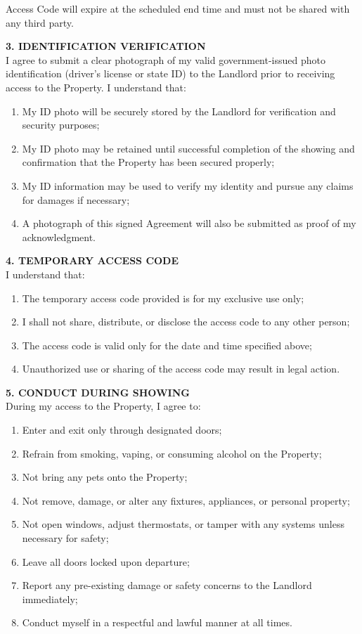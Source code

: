 \documentclass[11pt, letterpaper]{article}
\begin{document}
\begin{Form}
\vspace{0.3em}
Access Code will expire at the scheduled end time and must not be shared with any third party.

\textbf{3. IDENTIFICATION VERIFICATION}\\
I agree to submit a clear photograph of my valid government-issued photo identification (driver's license or state ID) to the Landlord prior to receiving access to the Property. I understand that:
\begin{enumerate}[label=\alph*), nosep, leftmargin=2em]
    \item My ID photo will be securely stored by the Landlord for verification and security purposes;
    \item My ID photo may be retained until successful completion of the showing and confirmation that the Property has been secured properly;
    \item My ID information may be used to verify my identity and pursue any claims for damages if necessary;
    \item A photograph of this signed Agreement will also be submitted as proof of my acknowledgment.
\end{enumerate}

\textbf{4. TEMPORARY ACCESS CODE}\\
I understand that:
\begin{enumerate}[label=\alph*), nosep, leftmargin=2em]
    \item The temporary access code provided is for my exclusive use only;
    \item I shall not share, distribute, or disclose the access code to any other person;
    \item The access code is valid only for the date and time specified above;
    \item Unauthorized use or sharing of the access code may result in legal action.
\end{enumerate}

\textbf{5. CONDUCT DURING SHOWING}\\
During my access to the Property, I agree to:
\begin{enumerate}[label=\alph*), nosep, leftmargin=2em]
    \item Enter and exit only through designated doors;
    \item Refrain from smoking, vaping, or consuming alcohol on the Property;
    \item Not bring any pets onto the Property;
    \item Not remove, damage, or alter any fixtures, appliances, or personal property;
    \item Not open windows, adjust thermostats, or tamper with any systems unless necessary for safety;
    \item Leave all doors locked upon departure;
    \item Report any pre-existing damage or safety concerns to the Landlord immediately;
    \item Conduct myself in a respectful and lawful manner at all times.
\end{enumerate}


\end{Form}
\end{document}
